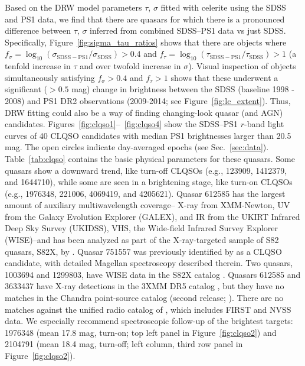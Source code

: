 \documentclass[twocolumn]{aastex62}
\newcommand{\project}[1]{\textsf{#1}}
\begin{document}
Based on the DRW model  parameters $\tau$, $\sigma$ fitted with \project{celerite} using the SDSS and PS1 data, we find that there are quasars for which there is a pronounced difference between $\tau$, $\sigma$  inferred from combined SDSS--PS1 data vs just SDSS. Specifically, Figure~\ref{fig:sigma_tau_ratios} shows that there are objects where $f_{\sigma} = \log_{10}{\left( \sigma_{\mathrm{SDSS-PS1}} / \sigma_{\mathrm{SDSS}} \right)} > 0.4 $ and $f_{\tau} = \log_{10}{\left( \tau_{\mathrm{SDSS-PS1}} / \tau_{\mathrm{SDSS}} \right)} > 1$ (a tenfold increase in $\tau$ and over twofold increase in $\sigma$). Visual inspection of objects simultaneously satisfying $f_{\sigma}> 0.4$ and $f_{\tau}> 1 $ shows that these underwent a significant ($>0.5$ mag) change in brightness between the SDSS (baseline 1998 - 2008) and PS1 DR2 observations (2009-2014; see Figure~\ref{fig:lc_extent}). Thus, DRW fitting could also be a way of finding changing-look quasar (and AGN) candidates. Figures~\ref{fig:clqso1}--~\ref{fig:clqso4} show the SDSS--PS1 $r$-band light curves of 40 CLQSO candidates with median PS1 brightnesses larger  than 20.5 mag. The open circles indicate day-averaged epochs (see Sec.~\ref{sec:data}). Table~\ref{tab:clqso} contains the basic physical parameters for these quasars. Some quasars show a downward trend, like turn-off CLQSOs (e.g., 123909, 1412379, and 1644710), while some are seen in a brightening stage, like turn-on CLQSOs (e.g., 1976348, 221006, 4069419, and 4205621). Quasar 612585 has the largest amount of auxiliary multiwavelength coverage-- X-ray from XMM-Newton, UV from the Galaxy Evolution Explorer (GALEX), and IR from the UKIRT Infrared Deep Sky Survey (UKIDSS), VHS, the Wide-field Infrared Survey Explorer (WISE)--and has been analyzed as part of the X-ray-targeted sample of S82 quasars, S82X, by \cite{lamassa2016a}. Quasar 751557 was previously identified by \cite{macleod2019} as a CLQSO candidate, with detailed Magellan spectroscopy described therein.  Two quasars, 1003694 and 1299803, have WISE data in the S82X catalog \citep{lamassa2016a}. Quasars 612585 and 3633437 have X-ray detections in the 3XMM DR5 catalog \citep{rosen2016}, but they have no matches in the Chandra point-source catalog (second release; \citealt{evans2010, evans2018}). There are no matches against the unified radio catalog of \cite{kimball2008}, which includes FIRST and NVSS data. We especially recommend spectroscopic follow-up of the brightest targets: 1976348 (mean 17.8 mag, turn-on; top left panel in Figure~\ref{fig:clqso2}) and 2104791 (mean 18.4 mag, turn-off; left column, third row panel in Figure~\ref{fig:clqso2}).
\end{document}
